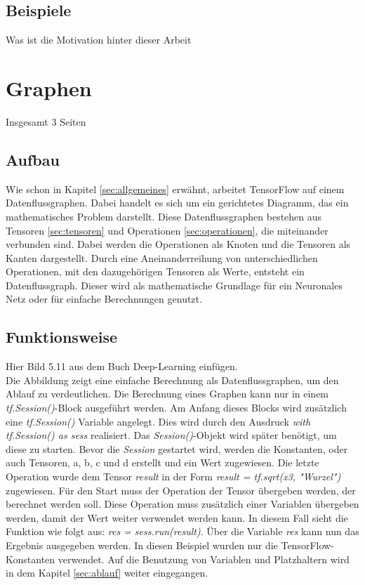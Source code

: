 \subsection{Beispiele}
\label{sec:beispiele}
Was ist die Motivation hinter dieser Arbeit

\section{Graphen}
\label{sec:graphen}
\printsubchapterauthor{\authorNiklas}
Insgesamt 3 Seiten

\subsection{Aufbau}
\label{sec:graphenAufbau}
Wie schon in Kapitel \ref{sec:allgemeines} erwähnt, arbeitet TensorFlow auf einem Datenflussgraphen. Dabei handelt es sich um ein gerichtetes Diagramm, das ein mathematisches Problem darstellt. Diese Datenflussgraphen bestehen aus Tensoren \ref{sec:tensoren} und Operationen \ref{sec:operationen}, die miteinander verbunden sind. Dabei werden die Operationen als Knoten und die Tensoren als Kanten dargestellt. Durch eine Aneinanderreihung von unterschiedlichen Operationen, mit den dazugehörigen Tensoren als Werte, entsteht ein Datenflussgraph. Dieser wird als mathematische Grundlage für ein Neuronales Netz oder für einfache Berechnungen genutzt.

\subsection{Funktionsweise}
\label{sec:graphenFunktionsweise}
Hier Bild 5.11 aus dem Buch Deep-Learning einfügen.\\
Die Abbildung zeigt eine einfache Berechnung als Datenflussgraphen, um den Ablauf zu verdeutlichen. Die Berechnung eines Graphen kann nur in einem \textit{tf.Session()}-Block ausgeführt werden. Am Anfang dieses Blocks wird zusätzlich eine \textit{tf.Session()} Variable angelegt. Dies wird durch den Ausdruck \textit{with tf.Session() as sess} realisiert. Das \textit{Session()}-Objekt wird später benötigt, um diese zu starten. Bevor die \textit{Session} gestartet wird, werden die Konstanten, oder auch Tensoren, a, b, c und d erstellt und ein Wert zugewiesen. Die letzte Operation wurde dem Tensor \textit{result} in der Form \textit{result = tf.sqrt(x3, "Wurzel")} zugewiesen. Für den Start muss der Operation der Tensor übergeben werden, der berechnet werden soll. Diese Operation muss zusätzlich einer Variablen übergeben werden, damit der Wert weiter verwendet werden kann. In diesem Fall sieht die Funktion wie folgt aus: \textit{res = sess.run(result)}. Über die Variable \textit{res} kann nun das Ergebnis ausgegeben werden. In diesen Beispiel wurden nur die TensorFlow-Konstanten verwendet. Auf die Benutzung von Variablen und Platzhaltern wird in dem Kapitel \ref{sec:ablauf} weiter eingegangen.

